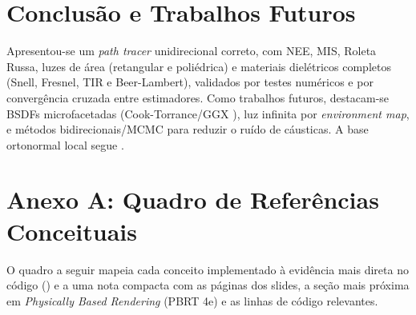 \documentclass[portuguese]{sbcreviews-2025}%
\newcommand{\pbrtbook}{\emph{Physically Based Rendering} (PBRT 4e)}
\begin{document}
\section{Conclusão e Trabalhos Futuros}
\label{sec:conclusao}

Apresentou-se um \emph{path tracer} unidirecional correto, com NEE, MIS, Roleta Russa, luzes
de área (retangular e poliédrica) e materiais dielétricos completos (Snell, Fresnel, TIR e
Beer-Lambert), validados por testes numéricos e por convergência cruzada entre estimadores.
Como trabalhos futuros, destacam-se BSDFs microfacetadas (Cook-Torrance/GGX
\citep{walter2007microfacet}), luz infinita por \emph{environment map}, e métodos
bidirecionais/MCMC para reduzir o ruído de cáusticas. A base ortonormal local segue
\citet{frisvad2012orthonormal}.




\clearpage

\section*{Anexo A: Quadro de Referências Conceituais}

O quadro a seguir mapeia cada conceito implementado à evidência mais direta no código
() e a uma nota compacta com as páginas dos slides, a seção mais
próxima em \pbrtbook{} e as linhas de código relevantes.
\end{document}
